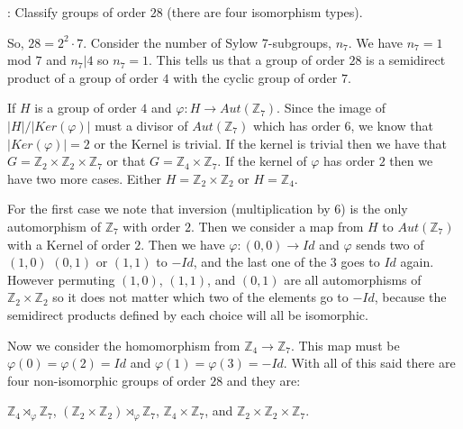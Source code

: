 \documentclass[12pt]{report}
\begin{document}
:
Classify groups of order $28$ (there are four isomorphism types).

So, $28 = 2^2 \cdot 7$. Consider the number of Sylow 7-subgroups, $n_7$. We have
$n_7 = 1$ mod $7$ and $n_7 | 4$ so $n_7 = 1$. This tells us that a group of
order $28$ is a semidirect product of a group of order $4$ with the cyclic group
of order $7$.

If $H$ is a group of order $4$ and $\varphi: H \to Aut(\mathbb{Z}_7)$. Since the
image of $|H|/|Ker(\varphi)|$ must a divisor of $Aut(\mathbb{Z}_7)$ which has
order $6$, we know that $|Ker(\varphi)| = 2$ or the Kernel is trivial. If the
kernel is trivial then we have that $G = \mathbb{Z}_2 \times \mathbb{Z}_2 \times
\mathbb{Z}_7$ or that $G =\mathbb{Z}_4 \times \mathbb{Z}_7$. If the kernel of
$\varphi$ has order $2$ then we have two more cases. Either $H = \mathbb{Z}_2
\times \mathbb{Z}_2$ or $H = \mathbb{Z}_4$.

For the first case we note that inversion (multiplication by 6) is the only
automorphism of $\mathbb{Z}_7$ with order $2$. Then we consider a map from $H$
to $Aut(\mathbb{Z}_7)$ with a Kernel of order $2$. Then we have $\varphi: (0,0)
\to Id$ and $\varphi$ sends two of $(1,0)$ $(0,1)$ or $(1,1)$ to $-Id$, and the
last one of the $3$ goes to $Id$ again. However permuting $(1,0)$, $(1,1)$, and
$(0,1)$ are all automorphisms of $\mathbb{Z}_2 \times \mathbb{Z}_2$ so it
does not matter which two of the elements go to $-Id$, because the semidirect
products defined by each choice will all be isomorphic.

Now we consider the homomorphism from $\mathbb{Z}_4 \to \mathbb{Z}_7$. This map
must be $\varphi(0) = \varphi(2) = Id$ and $\varphi(1) = \varphi(3) = -Id$. With
all of this said there are four non-isomorphic groups of order $28$ and they are:

$\mathbb{Z}_4 \rtimes_{\varphi} \mathbb{Z}_7$,
$(\mathbb{Z}_2 \times \mathbb{Z}_2) \rtimes_{\varphi} \mathbb{Z}_7$,
$\mathbb{Z}_4 \times \mathbb{Z}_7$, and
$\mathbb{Z}_2 \times \mathbb{Z}_2 \times \mathbb{Z}_7$.
\end{document}
